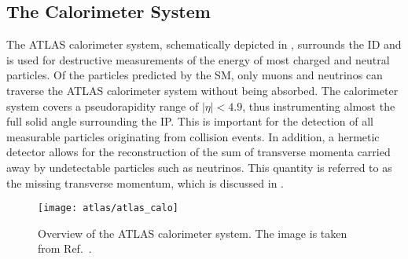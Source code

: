 \subsection{The Calorimeter System}%
\label{sec:atlas_calorimeters}


The ATLAS calorimeter system, schematically depicted in
, surrounds the ID and is used for destructive
measurements of the energy of most charged and neutral particles. Of the
particles predicted by the SM, only muons and neutrinos can traverse the ATLAS
calorimeter system without being absorbed. The calorimeter system covers a
pseudorapidity range of $|\eta| < 4.9$, thus instrumenting almost the full solid
angle surrounding the IP. This is important for the detection of all measurable
particles originating from collision events. In addition, a hermetic detector
allows for the reconstruction of the sum of transverse momenta carried away by
undetectable particles such as neutrinos. This quantity is referred to as the
missing transverse momentum, which is discussed in .


\begin{figure}[htbp]
  \centering

  \texttt{[image: atlas/atlas\_calo]}

  \caption[Overview of the ATLAS calorimeter system.]{Overview of the ATLAS
    calorimeter system. The image is taken from Ref.~\cite{PERF-2007-01}.}%
  \label{fig:atlas_calorimeters}
\end{figure}

